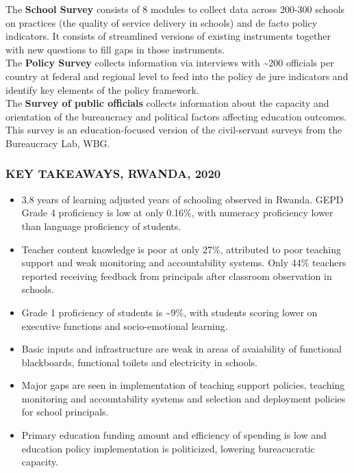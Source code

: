 \documentclass[twocolumn]{article}
\providecommand{\tightlist}{%
  \setlength{\itemsep}{0pt}\setlength{\parskip}{0pt}}
\begin{document}
The \textbf{School Survey} consists of 8 modules to collect data across
200-300 schools on practices (the quality of service delivery in
schools) and de facto policy indicators. It consists of streamlined
versions of existing instruments together with new questions to fill
gaps in those instruments.\\
The \textbf{Policy Survey} collects information via interviews with
\textasciitilde{}200 officials per country at federal and regional level
to feed into the policy de jure indicators and identify key elements of
the policy framework.\\
The \textbf{Survey of public officials} collects information about the
capacity and orientation of the bureaucracy and political factors
affecting education outcomes. This survey is an education-focused
version of the civil-servant surveys from the Bureaucracy Lab, WBG.

\hypertarget{key-takeaways-2020}{%
\subsubsection{\texorpdfstring{\textbf{KEY TAKEAWAYS,
\uppercase{Rwanda},
2020}}{KEY TAKEAWAYS, , 2020}}\label{key-takeaways-2020}}

\begin{itemize}
\tightlist
\item
  3.8 years of learning adjusted years of schooling observed in Rwanda.
  GEPD Grade 4 proficiency is low at only 0.16\%, with numeracy
  proficiency lower than language proficiency of students.
\item
  Teacher content knowledge is poor at only 27\%, attributed to poor
  teaching support and weak monitoring and accountability systems. Only
  44\% teachers reported receiving feedback from principals after
  classroom observation in schools.
\item
  Grade 1 proficiency of students is \textasciitilde{}9\%, with students
  scoring lower on executive functions and socio-emotional learning.
\item
  Basic inputs and infrastructure are weak in areas of avaiability of
  functional blackboards, functional toilets and electricity in schools.
\item
  Major gaps are seen in implementation of teaching support policies,
  teaching monitoring and accountability systems and selection and
  deployment policies for school principals.
\item
  Primary education funding amount and efficiency of spending is low and
  education policy implementation is politicized, lowering bureacucratic
  capacity.
\end{itemize}
\end{document}
